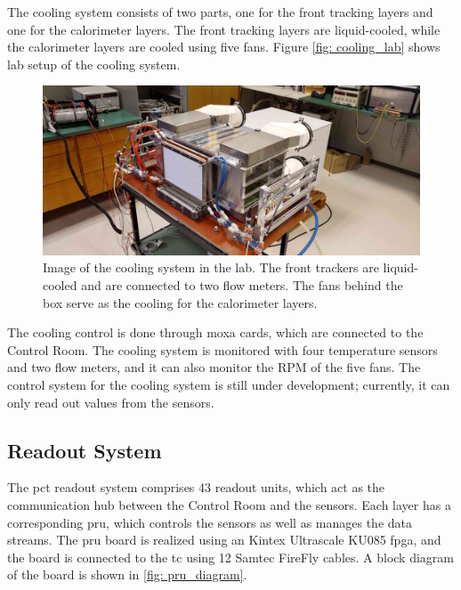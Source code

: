 \documentclass[main.tex]{subfiles}
\begin{document}
The cooling system consists of two parts, one for the front tracking layers and one for the calorimeter layers. The front tracking layers are liquid-cooled, while the calorimeter layers are cooled using five fans. Figure \autoref{fig: cooling_lab} shows lab setup of the cooling system.

\begin{figure}[!htpb]
    \centering
    \includegraphics[width=15cm]{images/cooling.jpg}
    \caption{Image of the cooling system in the lab. The front trackers are liquid-cooled and are connected to two flow meters. The fans behind the box serve as the cooling for the calorimeter layers.}
    \label{fig: cooling_lab}
\end{figure}
\FloatBarrier

The cooling control is done through moxa cards, which are connected to the Control Room. The cooling system is monitored with four temperature sensors and two flow meters, and it can also monitor the RPM of the five fans. The control system for the cooling system is still under development; currently, it can only read out values from the sensors.


\subsection{Readout System}

The \gls{pct} readout system comprises 43 readout units, which act as the communication hub between the Control Room and the sensors. Each layer has a corresponding \gls{pru}, which controls the sensors as well as manages the data streams. The \gls{pru} board is realized using an Kintex Ultrascale KU085 \gls{fpga}, and the board is connected to the \gls{tc} using 12 Samtec FireFly cables. A block diagram of the board is shown in \autoref{fig: pru_diagram}.
\end{document}
